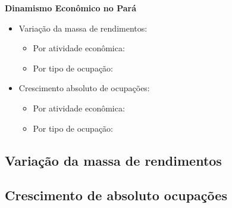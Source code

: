 \documentclass[8pt]{beamer}
\begin{document}
\begin{frame}[label=indice_principal_amz_pa]{}

\textit{\hyperlink{indice_principal}{}}

\textbf{Dinamismo Econômico no Pará}
\vspace{2mm}

\begin{itemize}

\item{Variação da massa de rendimentos:
	\begin{itemize}
	\item{Por atividade econômica: \hyperlink{amzparkngvmassaporcnae2dig}{}}
	\item{Por tipo de ocupação: \hyperlink{amzparkngvmassaporcod2dig}{}}
	\end{itemize}
}
\vspace{1mm}

\item{Crescimento  absoluto de ocupações:
	\begin{itemize}
	\item{Por atividade econômica: \hyperlink{amzparkngnocuporcnae2dig}{}}
	\item{Por tipo de ocupação: \hyperlink{amzparkngnocuporcod2dig}{}}
	\end{itemize}
}
\vspace{1mm}

\end{itemize}

\end{frame}


\subsection{Variação da massa de rendimentos}

\begin{frame}
\textit{\hyperlink{indice_principal_amz_pa}{}}

\end{frame}

\begin{frame}
\textit{\hyperlink{indice_principal_amz_pa}{}}

\end{frame}

\subsection{Crescimento de absoluto ocupações}
\end{document}
